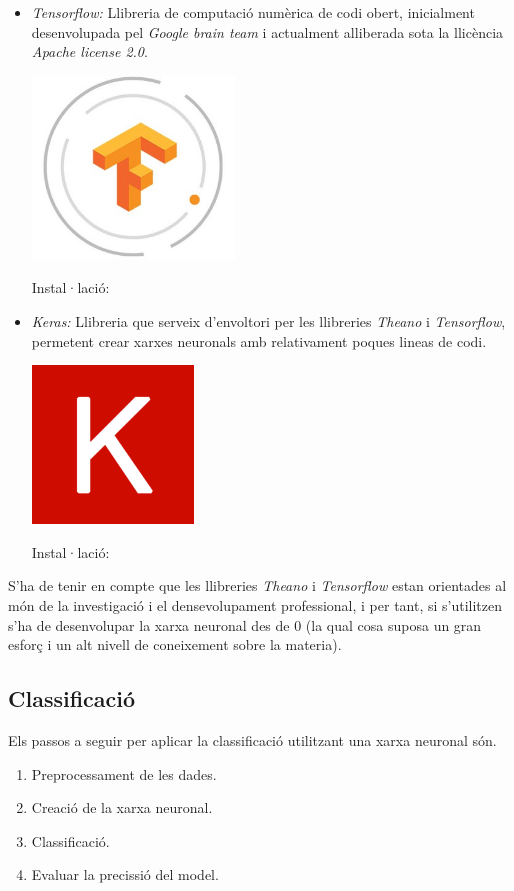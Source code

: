 \documentclass[12pt]{article}
\begin{document}
\begin{itemize}
	\item \textit{Tensorflow:} Llibreria de computació numèrica de codi obert, inicialment desenvolupada pel \textit{Google brain team} i actualment alliberada sota la llicència \textit{Apache license 2.0}. 
	\begin{center}
		\includegraphics[scale=0.4]{imatges/eines/tensorflow.png}
	\end{center}
	Instal·lació: 
	
	\item \textit{Keras:} Llibreria que serveix d'envoltori per les llibreries \textit{Theano} i \textit{Tensorflow}, permetent crear xarxes neuronals amb relativament poques lineas de codi.
	\begin{center}
		\includegraphics[scale=0.4]{imatges/eines/keras.png}	
	\end{center}
	Instal·lació: 
	
\end{itemize}
S'ha de tenir en compte que les llibreries \textit{Theano} i \textit{Tensorflow} estan orientades al món de la investigació i el densevolupament professional, i per tant, si s'utilitzen s'ha de desenvolupar la xarxa neuronal des de 0 (la qual cosa suposa un gran esforç i un alt nivell de coneixement sobre la materia).
\clearpage
\subsection{Classificació}
Els passos a seguir per aplicar la classificació utilitzant una xarxa neuronal són.
\begin{enumerate}
	\item Preprocessament de les dades.
	\item Creació de la xarxa neuronal.
	\item Classificació.
	\item Evaluar la precissió del model.
\end{enumerate}
\end{document}
